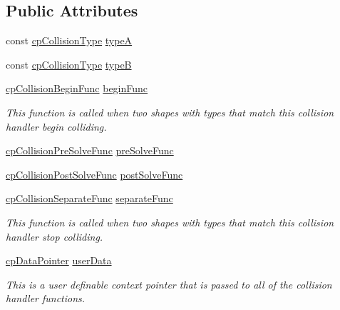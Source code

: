 \subsection*{Public Attributes}
\begin{DoxyCompactItemize}
\item 
const \hyperlink{group__basicTypes_gae83e2f50965eb441e36ffff1e32e6d02}{cp\+Collision\+Type} \hyperlink{structcpCollisionHandler_a07bbc9d26af9d41cc87bae6514930d9f}{typeA}
\item 
const \hyperlink{group__basicTypes_gae83e2f50965eb441e36ffff1e32e6d02}{cp\+Collision\+Type} \hyperlink{structcpCollisionHandler_a7f9def10b179d18de37bec5b3c6d8621}{typeB}
\item 
\mbox{\label{structcpCollisionHandler_a64f552c94d44dfd3844869ea9dada78f}} 
\hyperlink{group__cpSpace_ga3134f145bfc7ca4ef69b350978c26a5a}{cp\+Collision\+Begin\+Func} \hyperlink{structcpCollisionHandler_a64f552c94d44dfd3844869ea9dada78f}{begin\+Func}
\begin{DoxyCompactList}\small\item\em This function is called when two shapes with types that match this collision handler begin colliding. \end{DoxyCompactList}\item 
\hyperlink{group__cpSpace_ga89b24d53d81a5a028198c3c2d3c39a9d}{cp\+Collision\+Pre\+Solve\+Func} \hyperlink{structcpCollisionHandler_aff35bdeedae80600cbbb1a68682a7431}{pre\+Solve\+Func}
\item 
\hyperlink{group__cpSpace_gaccb60bbb090c97823f49ee49e4e5d3c3}{cp\+Collision\+Post\+Solve\+Func} \hyperlink{structcpCollisionHandler_adc3df1896d48519cc5359c51bd67ac98}{post\+Solve\+Func}
\item 
\mbox{\label{structcpCollisionHandler_a1823a67807ba11b1bae7f41024cd6ce0}} 
\hyperlink{group__cpSpace_ga01427ab634c483879cfed5bb22610487}{cp\+Collision\+Separate\+Func} \hyperlink{structcpCollisionHandler_a1823a67807ba11b1bae7f41024cd6ce0}{separate\+Func}
\begin{DoxyCompactList}\small\item\em This function is called when two shapes with types that match this collision handler stop colliding. \end{DoxyCompactList}\item 
\mbox{\label{structcpCollisionHandler_af2b874e87431e407a4045cb90d999b8a}} 
\hyperlink{group__basicTypes_ga2ac2c3c31e21893941f9e4f8ee279447}{cp\+Data\+Pointer} \hyperlink{structcpCollisionHandler_af2b874e87431e407a4045cb90d999b8a}{user\+Data}
\begin{DoxyCompactList}\small\item\em This is a user definable context pointer that is passed to all of the collision handler functions. \end{DoxyCompactList}\end{DoxyCompactItemize}


